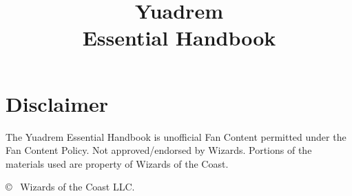 \documentclass[letterpaper,twocolumn,openany,nodeprecatedcode]{dndbook}
\title{Yuadrem \\
\large Essential Handbook}
\author{}
\date{}
\begin{document}
    \frontmatter
    \maketitle
    \justifying


    \section*{Disclaimer}
        The Yuadrem Essential Handbook is unofficial Fan Content permitted under the Fan Content Policy.
        Not approved/endorsed by Wizards.
        Portions of the materials used are property of Wizards of the Coast.

        \copyright~ Wizards of the Coast LLC.

    \tableofcontents

    \mainmatter%

    \begin{linenumbers}
    \DndSetThemeColor[DmgCoral]
    
    
    \DndSetThemeColor[DmgLavender]
    
    
    
    
    \DndSetThemeColor[DmgLilac]
    
    
    \DndSetThemeColor[DmgSlateGray]
    
    \end{linenumbers}
\end{document}
